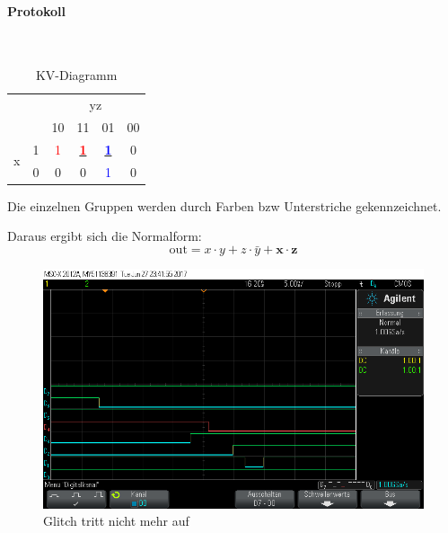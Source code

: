 \documentclass[10pt]{scrreprt}
\begin{document}
    \paragraph{Protokoll}
    $ $

    \begin{table}[H]
        \centering
        \begin{tabular}{cc|cccc}
            & &  & \multicolumn{2}{c}{yz}\\
            & & 10 & 11 & 01 & 00\\
            \midrule
            \multirow{ 2}{*}{x} & 1 & \textcolor{red}{1} & \textbf{\underline{\textcolor{red}{1}}} & \textbf{\underline{\textcolor{blue}{1}}} & 0\\
             & 0 & 0 & 0 & \textcolor{blue}{1} & 0\\
        \end{tabular}
        \caption{KV-Diagramm}
    \end{table}

    Die einzelnen Gruppen werden durch Farben bzw Unterstriche gekennzeichnet.

    Daraus ergibt sich die Normalform:
    \begin{equation*}
        \text{out} = x \cdot y + z \cdot \bar{y} + \mathbf{x \cdot z}
    \end{equation*}

    \begin{figure}[H]
        \includegraphics[width=\textwidth]{scope_13.png}
        \caption{Glitch tritt nicht mehr auf}
    \end{figure}
\end{document}
